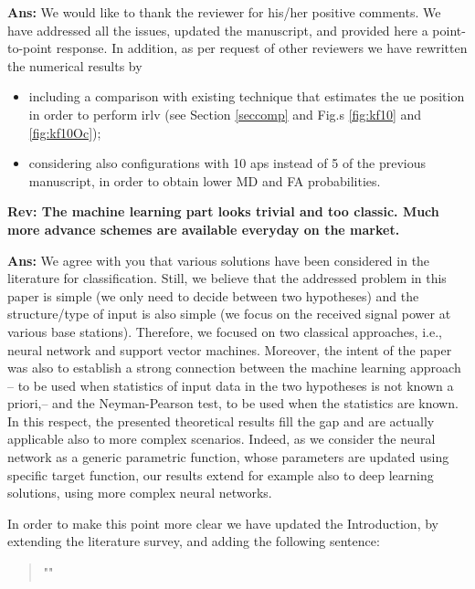 \documentclass[draftcls,onecolumn,12pt]{IEEEtran}
\newcounter{revc}
\newcommand{\revp}[1]{\zref[revcontent]{#1}}
\begin{document}

{\bf Ans:} We would like to thank the reviewer for his/her positive comments. We have addressed all the issues, updated the manuscript, and provided here a point-to-point response. In addition, as per request of other reviewers we have rewritten the numerical results by 
\begin{itemize}
    \item including a comparison with existing technique that estimates the \ac{ue} position in order to perform \ac{irlv} (see Section \ref{seccomp} and Fig.s \ref{fig:kf10} and \ref{fig:kf10Oc});
    \item considering also configurations with 10 \acp{ap} instead of 5 of the previous manuscript, in order to obtain lower MD and FA probabilities.
\end{itemize}


\vspace{5mm} %
\begin{framed}
{\bf Rev: The machine learning part looks trivial and too classic. Much more advance schemes are available everyday on the market.}
\end{framed}
 

{\bf Ans:} We agree with you that various solutions have been considered in the literature for classification. Still, we believe that the addressed problem in this paper is simple (we only need to decide between two hypotheses) and the structure/type of input is also simple (we focus on the received signal power at various base stations). Therefore, we focused on two classical approaches, i.e., neural network and support vector machines. Moreover, the intent of the paper was also to establish a strong connection between the machine learning approach -- to be used when statistics of input data in the two hypotheses is not known a priori,-- and the Neyman-Pearson test, to be used when the statistics are known. In this respect, the presented theoretical results fill the gap and are actually applicable also to more complex scenarios. Indeed, as we consider the neural network as a generic parametric function, whose parameters are updated using specific target function, our results extend for example also to deep learning solutions, using more complex neural networks.

In order to make this point more clear we have updated the Introduction, by extending the literature survey, and adding the following sentence:
\begin{quote}
    "\revp{rev11a}"
\end{quote}
\end{document}
